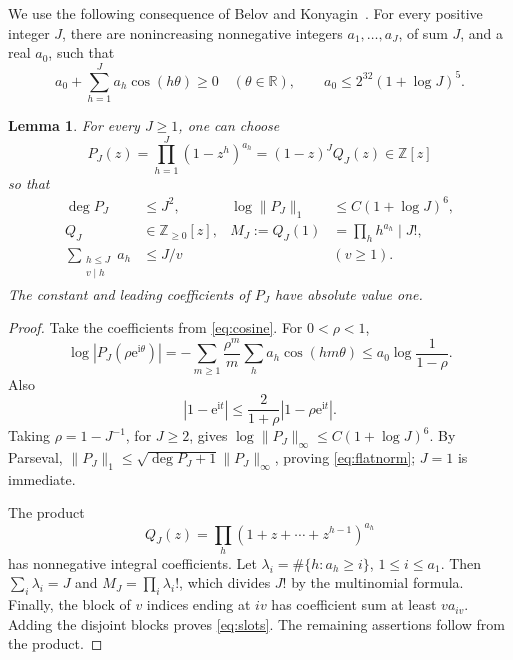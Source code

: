 \documentclass[11pt]{amsart}
\numberwithin{equation}{section}
\newtheorem{lemma}[theorem]{Lemma}
\theoremstyle{remark}
\newcommand{\Z}{\mathbb Z}
\newcommand{\R}{\mathbb R}
\newcommand{\e}{\mathrm e}
\newcommand{\ii}{\mathrm i}
\newcommand{\normone}[1]{\lVert #1\rVert_1}
\begin{document}
We use the following consequence of Belov and
Konyagin~\cite[Corollary~0.2]{BK}. For every positive integer \(J\), there
are nonincreasing nonnegative integers \(a_1,\ldots,a_J\), of sum \(J\),
and a real \(a_0\), such that
\begin{equation}\label{eq:cosine}
 a_0+\sum_{h=1}^J a_h\cos(h\theta)\ge0\quad(\theta\in\R),
 \qquad a_0\le2^{32}(1+\log J)^5.
\end{equation}

\begin{lemma}\label{lem:flat}
For every \(J\ge1\), one can choose
\[
 P_J(z)=\prod_{h=1}^J(1-z^h)^{a_h}=(1-z)^JQ_J(z)\in\Z[z]
\]
so that
\begin{align}
 \deg P_J&\le J^2,&
 \log\normone{P_J}&\le C(1+\log J)^6,\label{eq:flatnorm}\\
 Q_J&\in\Z_{\ge0}[z],&
 M_J:=Q_J(1)&=\prod_h h^{a_h}\mid J!,\label{eq:moment}\\
 \sum_{\substack{h\le J\\v\mid h}}a_h&\le J/v&& (v\ge1).
 \label{eq:slots}
\end{align}
The constant and leading coefficients of \(P_J\) have absolute value one.
\end{lemma}
\begin{proof}
Take the coefficients from \eqref{eq:cosine}. For \(0<\rho<1\),
\[
 \log|P_J(\rho\e^{\ii\theta})|
 =-\sum_{m\ge1}\frac{\rho^m}{m}\sum_h a_h\cos(hm\theta)
 \le a_0\log\frac1{1-\rho}.
\]
Also
\[
 |1-\e^{\ii t}|\le\frac2{1+\rho}|1-\rho\e^{\ii t}|.
\]
Taking \(\rho=1-J^{-1}\), for \(J\ge2\), gives
\(\log\|P_J\|_\infty\le C(1+\log J)^6\).
By Parseval,
\(\normone{P_J}\le\sqrt{\deg P_J+1}\|P_J\|_\infty\), proving
\eqref{eq:flatnorm}; \(J=1\) is immediate.

The product
\[
 Q_J(z)=\prod_h(1+z+\cdots+z^{h-1})^{a_h}
\]
has nonnegative integral coefficients.
Let \(\lambda_i=\#\{h:a_h\ge i\}\), \(1\le i\le a_1\).
Then \(\sum_i\lambda_i=J\) and
\(M_J=\prod_i\lambda_i!\), which divides \(J!\) by the multinomial
formula. Finally, the block of \(v\) indices ending at \(iv\) has
coefficient sum at least \(va_{iv}\). Adding the disjoint blocks proves
\eqref{eq:slots}. The remaining assertions follow from the product.
\end{proof}
\end{document}
